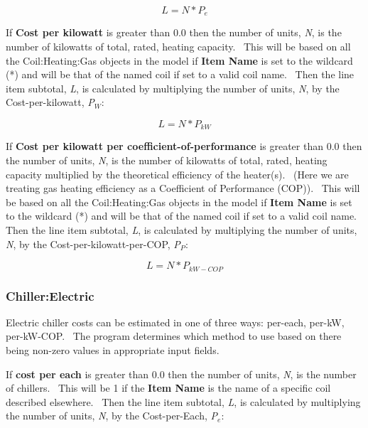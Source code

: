 \begin{equation}
L = N * {P_e}
\end{equation}

If \textbf{Cost per kilowatt} is greater than 0.0 then the number of units, \emph{N}, is the number of kilowatts of total, rated, heating capacity.~ This will be based on all the Coil:Heating:Gas objects in the model if \textbf{Item Name} is set to the wildcard (*) and will be that of the named coil if set to a valid coil name.~ Then the line item subtotal, \emph{L}, is calculated by multiplying the number of units, \emph{N}, by the Cost-per-kilowatt, \emph{P\(_{W}\)}:

\begin{equation}
L = N * {P_{kW}}
\end{equation}

If \textbf{Cost per kilowatt per coefficient-of-performance} is greater than 0.0 then the number of units, \emph{N}, is the number of kilowatts of total, rated, heating capacity multiplied by the theoretical efficiency of the heater(s).~ (Here we are treating gas heating efficiency as a Coefficient of Performance (COP)).~ This will be based on all the Coil:Heating:Gas objects in the model if \textbf{Item Name} is set to the wildcard (*) and will be that of the named coil if set to a valid coil name.~ Then the line item subtotal, \emph{L}, is calculated by multiplying the number of units, \emph{N}, by the Cost-per-kilowatt-per-COP, \emph{P\(_{P}\)}:

\begin{equation}
L = N * {P_{kW - COP}}
\end{equation}

\subsubsection{Chiller:Electric}\label{chillerelectric}

Electric chiller costs can be estimated in one of three ways: per-each, per-kW, per-kW-COP.~ The program determines which method to use based on there being non-zero values in appropriate input fields.

If \textbf{cost per each} is greater than 0.0 then the number of units, \emph{N}, is the number of chillers.~ This will be 1 if the \textbf{Item Name} is the name of a specific coil described elsewhere.~ Then the line item subtotal, \emph{L}, is calculated by multiplying the number of units, \emph{N}, by the Cost-per-Each, \emph{P\(_{e}\)}:

